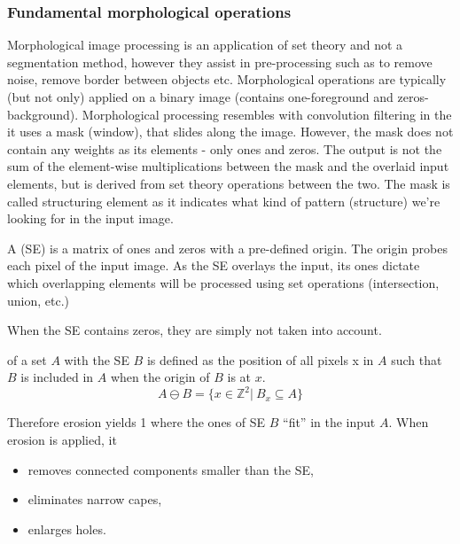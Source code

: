 \documentclass[a4paper]{article}
\begin{document}
\subsubsection{Fundamental morphological operations}
Morphological image processing is an application of set theory and not a segmentation method, however they assist in pre-processing such as to remove noise, remove border between objects etc.
Morphological operations are typically (but not only) applied on a binary image (contains one-foreground and zeros-background). Morphological processing resembles with convolution filtering in the it uses a mask (window), that slides along the image. However, the mask does not contain any weights as its elements - only ones and zeros. The output is not the sum of the element-wise multiplications between the mask and the overlaid input elements, but is derived from set theory operations between the two. The mask is called structuring element as it indicates what kind of pattern (structure) we're looking for in the input image.
\begin{definition}
A  (SE) is a matrix of ones and zeros with a pre-defined origin. The origin probes each pixel of the input image. As the SE overlays the input, its ones dictate which overlapping elements will be processed using set operations (intersection, union, etc.)
\end{definition}
When the SE contains zeros, they are simply not taken into account.
\begin{definition}
 of a set $A$ with the SE $B$ is defined as the position of all
pixels x in $A$ such that $B$ is included in $A$
when the origin of $B$ is at $x$.
\begin{equation}
    A \ominus B = \{x \in \mathbb{Z}^2 \left|\ B_x \subseteq A \right. \}
\end{equation}
\end{definition}
Therefore erosion yields 1 where the ones of SE $B$ ``fit'' in the input $A$. When erosion is applied, it
\begin{itemize}
    \item removes connected components smaller than the SE,
    \item eliminates narrow capes,
    \item enlarges holes.
\end{itemize}
\end{document}
